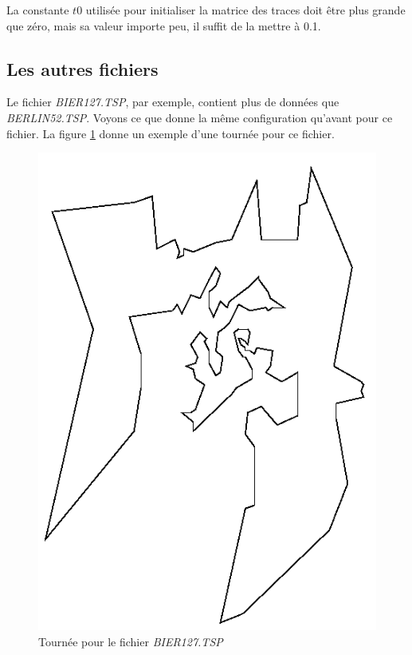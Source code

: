 \documentclass[a4paper, 11pt]{article}
\begin{document}
{	La constante $t0$ utilisée pour initialiser la matrice des traces doit être plus grande que zéro, mais sa valeur importe peu, il suffit de la mettre à 0.1.

\subsection{Les autres fichiers}
	Le fichier \textit{BIER127.TSP}, par exemple, contient plus de données que \textit{BERLIN52.TSP}. Voyons ce que donne la même configuration qu'avant pour ce fichier. La figure \ref{fig:8} donne un exemple d'une tournée pour ce fichier.

\begin{figure}[H]
   \begin{center}
      \includegraphics[width=14cm]{../images/8.png}
   \end{center}
   \caption{Tournée pour le fichier \textit{BIER127.TSP}}
	\label{fig:8}
\end{figure}

}
\end{document}
